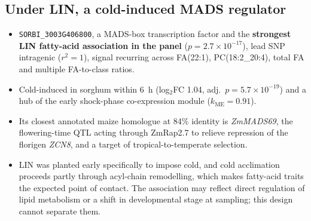 \documentclass[11pt]{article}
\newcommand{\lead}[1]{\textbf{#1}}
\begin{document}
\subsection{Under LIN, a cold-induced MADS regulator}
\begin{itemize}
  \item \texttt{SORBI\_3003G406800}, a MADS-box transcription factor and the
        \lead{strongest LIN fatty-acid association in the panel}
        ($p=2.7\times10^{-17}$), lead SNP intragenic ($r^2=1$), signal recurring
        across FA(22:1), PC(18:2\_20:4), total FA and multiple FA-to-class ratios.
  \item Cold-induced in sorghum within 6~h (log$_2$FC 1.04, adj.\
        $p=5.7\times10^{-19}$) and a hub of the early shock-phase co-expression
        module ($k_{\mathrm{ME}}=0.91$).
  \item Its closest annotated maize homologue at 84\% identity is
        \textit{ZmMADS69}, the flowering-time QTL acting through ZmRap2.7 to
        relieve repression of the florigen \textit{ZCN8}, and a target of
        tropical-to-temperate selection.
  \item LIN was planted early specifically to impose cold, and cold acclimation
        proceeds partly through acyl-chain remodelling, which makes fatty-acid
        traits the expected point of contact. The association may reflect direct
        regulation of lipid metabolism or a shift in developmental stage at
        sampling; this design cannot separate them.
\end{itemize}
\end{document}
